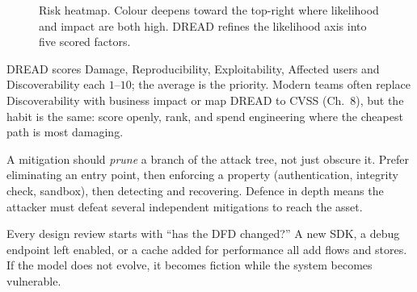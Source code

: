 \begin{figure}[h]\centering
{}
\caption{Risk heatmap. Colour deepens toward the top-right where likelihood and impact are both high. DREAD refines the likelihood axis into five scored factors.}
\label{fig:risk-heatmap}
\end{figure}

DREAD scores Damage, Reproducibility, Exploitability, Affected users and Discoverability each $1$--$10$; the average is the priority. Modern teams often replace Discoverability with business impact or map DREAD to CVSS (Ch.~8), but the habit is the same: score openly, rank, and spend engineering where the cheapest path is most damaging.

A mitigation should \emph{prune} a branch of the attack tree, not just obscure it. Prefer eliminating an entry point, then enforcing a property (authentication, integrity check, sandbox), then detecting and recovering. Defence in depth means the attacker must defeat several independent mitigations to reach the asset.

\begin{remark}
Every design review starts with ``has the DFD changed?'' A new SDK, a debug endpoint left enabled, or a cache added for performance all add flows and stores. If the model does not evolve, it becomes fiction while the system becomes vulnerable.
\end{remark}

